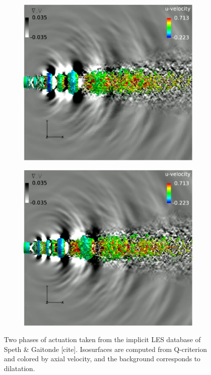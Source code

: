 \begin{figure}
	\centering
	\begin{subfigure}{.5\textwidth}
		\centering
		\includegraphics[width=0.95\linewidth]{Figures/LES_dilatation1.jpg}
		\caption{}
	\end{subfigure}%
	\begin{subfigure}{.5\textwidth}
		\centering
		\includegraphics[width=0.95\linewidth]{Figures/LES_dilatation2.jpg}
		\caption{}
	\end{subfigure}
	\caption{Two phases of actuation taken from the implicit LES database of Speth \& Gaitonde [cite]. Isosurfaces are computed from Q-criterion and colored by axial velocity, and the background corresponds to dilatation.}
	\label{fig:LES_dilatation}
\end{figure}
